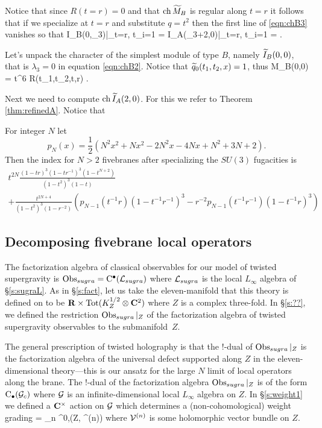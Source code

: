 Notice that since $R(t=r) = 0$ and that $\operatorname{ch} \widetilde M_B$ is regular along $t=r$ it follows that if we specialize at $t = r$ and substitute $q = t^2$ then the first line of \eqref{eqn:chB3} vanishes so that
\beqn
\ch \til I_B(0,\lambda_3)|_{t=r, t_i=1} = \ch \til I_A(\lambda_3+2,0)|_{t=r, t_i=1} =  .
\eeqn

\parsec[s:Bfirstcase]

Let's unpack the character of the simplest module of type $B$, namely $\widetilde I_B(0,0)$, that is $\lambda_3 = 0$ in equation \ref{eqn:chB2}.
Notice that $\widetilde q_0 (t_1,t_2,x) = 1$, thus
\beqn
\ch \til M_B(0,0) = t^6 R(t_1,t_2,t,r) .
\eeqn

Next we need to compute $\operatorname{ch} \widetilde I_A(2, 0)$.
For this we refer to Theorem \ref{thm:refinedA}.
Notice that 


\parsec[s:typeBunrefinedKR]


For integer $N$ let 
\[
p_{N}(x) = \frac12 \left(N^2 x^2 + N x^2 - 2N^2x -4 N x + N^2 + 3N +2\right) .
\]
Then the index for $N > 2$ fivebranes after specializing the $SU(3)$ fugacities is
\begin{multline}
t^{2 N} \frac{(1-tr)^3 (1-tr^{-1})^3 (1-t^{N+2})}{(1-t^2)^3(1 - t)} \\ + \frac{t^{2N + 4}}{(1-t^2)^3 (1-r^{-2})} \left(p_{N-1} (t^{-1} r) (1 - t^{-1} r^{-1})^3 - r^{-2} p_{N-1}(t^{-1} r^{-1})(1-t^{-1}r)^3 \right) 
\end{multline}

\subsection{Decomposing fivebrane local operators}
\label{s:kacfivebrane}

The factorization algebra of classical observables for our model of twisted supergravity is $\operatorname{Obs}_{sugra} = {\rm C}^\bullet(\mathcal L_{sugra})$ where $\mathcal L_{sugra}$ is the local $L_\infty$ algebra of \S\ref{s:sugraL}. 
As in \S\ref{s:fact}, let us take the eleven-manifold that this theory is defined on to be $\mathbf{R} \times {\rm Tot}(K^{1/2}_Z \otimes \mathbf{C}^2)$ where $Z$ is a complex three-fold.
In \S\ref{s:??}, we defined the restriction $\operatorname{Obs}_{sugra}|_{Z}$ of the factorization algebra of twisted supergravity observables to the submanifold~$Z$.

The general prescription of twisted holography is that the $!$-dual of $\operatorname{Obs}_{sugra}|_Z$ is the factorization algebra of the universal defect supported along $Z$ in the eleven-dimensional theory---this is our ansatz for the large $N$ limit of local operators along the brane.
The $!$-dual of the factorization algebra $\operatorname{Obs}_{sugra}|_Z$ is of the form ${\rm C}_\bullet (\mathcal G_c)$ where $\mathcal G$ is an infinite-dimensional local $L_\infty$ algebra on $Z$.
In \S \ref{s:weight1} we defined a $\mathbf{C}^\times$ action on $\mathcal G$ which determines a (non-cohomological) weight grading
\beqn\label{eqn:decomp2a}
\cG = \bigoplus_{n } \Omega^{0,\bu}(Z, \cV^{(n)}) 
\eeqn
where $\mathcal V^{(n)}$ is some holomorphic vector bundle on $Z$.

